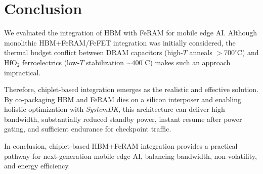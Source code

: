 \section{Conclusion}
We evaluated the integration of HBM with FeRAM for mobile edge AI. 
Although monolithic HBM+FeRAM/FeFET integration was initially considered, 
the thermal budget conflict between DRAM capacitors (high-$T$ anneals $>700^\circ$C) 
and HfO$_2$ ferroelectrics (low-$T$ stabilization $\sim400^\circ$C) makes such an approach impractical.  

Therefore, chiplet-based integration emerges as the realistic and effective solution. 
By co-packaging HBM and FeRAM dies on a silicon interposer and enabling holistic optimization with \textit{SystemDK}, 
this architecture can deliver high bandwidth, substantially reduced standby power, 
instant resume after power gating, and sufficient endurance for checkpoint traffic.  

In conclusion, chiplet-based HBM+FeRAM integration provides a practical pathway for next-generation mobile edge AI, 
balancing bandwidth, non-volatility, and energy efficiency.
